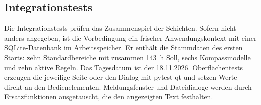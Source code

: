 \endgroup
{}

\subsection{Integrationstests}\label{sec:protokoll-integration}
Die Integrationstests prüfen das Zusammenspiel der Schichten. Sofern nicht anders angegeben, ist die Vorbedingung ein frischer Anwendungskontext mit einer SQLite-Datenbank im Arbeitsspeicher. Er enthält die Stammdaten des ersten Starts: zehn Standardbereiche mit zusammen 143~h Soll, sechs Kompassmodelle und zehn aktive Regeln. Das Tagesdatum ist der 18.11.2026. Oberflächentests erzeugen die jeweilige Seite oder den Dialog mit pytest-qt und setzen Werte direkt an den Bedienelementen. Meldungsfenster und Dateidialoge werden durch Ersatzfunktionen ausgetauscht, die den angezeigten Text festhalten.

